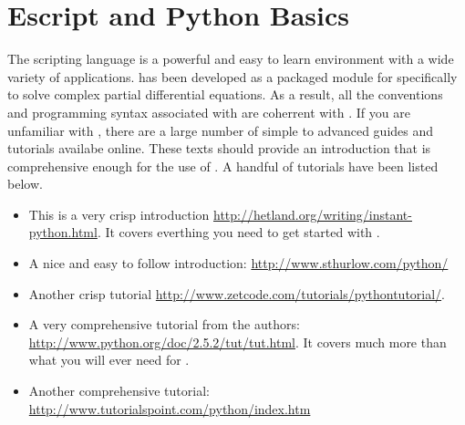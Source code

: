 
%
%
%

\section{Escript and Python Basics} \label{sec:escpybas}

The \pyt scripting language is a powerful and easy to learn environment with a wide variety of applications. \esc has been developed as a packaged module for \pyt specifically to solve complex partial differential equations. As a result, all the conventions and programming syntax associated with \pyt are coherrent with \esc. If you are unfamiliar with \pyt, there are a large number of simple to advanced guides and tutorials availabe online. These texts should provide an introduction that is comprehensive enough for the use of \esc. A handful of \pyt tutorials have been listed below.
\begin{itemize}
\item This is a very crisp introduction \url{http://hetland.org/writing/instant-python.html}. It covers everthing you need to get started with \esc.
\item A nice and easy to follow introduction: \url{http://www.sthurlow.com/python/}
\item Another crisp tutorial \url{http://www.zetcode.com/tutorials/pythontutorial/}. 
 \item A very comprehensive tutorial from the \pyt authors: \url{http://www.python.org/doc/2.5.2/tut/tut.html}. It covers much more than what you will ever need for \esc.
\item Another comprehensive tutorial: \url{http://www.tutorialspoint.com/python/index.htm}
\end{itemize} 

